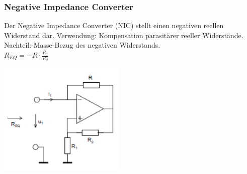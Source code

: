        	 \subsubsection{Negative Impedance Converter}
       	 \begin{minipage}[b]{12cm}
       	 	Der Negative Impedance Converter (NIC) stellt einen negativen reellen Widerstand
       	 	dar. Verwendung: Kompensation parasitärer reeller Widerstände. \\
       	 	Nachteil: Masse-Bezug des negativen Widerstands. \bigskip \\
       	 	$R_{EQ}=-R \cdot \frac{R_1}{R_2}$\\
       	 \end{minipage}
       	 \begin{minipage}[t]{6cm}
       	 	\includegraphics[width=6cm]{./images/neg-imp-conv.png}
       	 \end{minipage}
            
